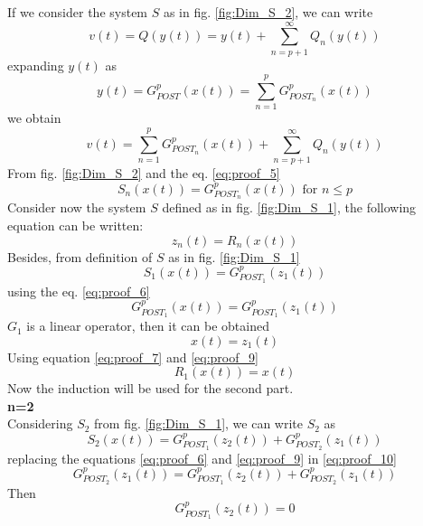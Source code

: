 If we consider the system $S$ as in fig. \ref{fig:Dim_S_2}, we can write
\begin{equation}
v(t) = Q(y(t)) = y(t) + \sum_{n=p+1}^\infty Q_n (y(t))
\end{equation}
expanding $y(t)$ as
\begin{equation}
y(t) = G_{POST}^p (x(t)) = \sum_{n=1}^p G_{POST_n}^p (x(t))
\end{equation}
we obtain
\begin{equation}
v(t) = \sum_{n=1}^p G_{POST_n}^p (x(t)) + \sum_{n=p+1}^\infty Q_n (y(t))
\label{eq:proof_5}
\end{equation}
From fig. \ref{fig:Dim_S_2} and the eq. \ref{eq:proof_5}
\begin{equation}
S_n(x(t)) = G_{POST_n}^p (x(t)) \text{ for } n \leq p
\label{eq:proof_6}
\end{equation}
Consider now the system $S$ defined as in fig. \ref{fig:Dim_S_1}, the following equation can be written:
\begin{equation}
z_n(t) = R_n(x(t))
\label{eq:proof_7}
\end{equation}
Besides, from definition of $S$ as in fig. \ref{fig:Dim_S_1}
\begin{equation}
S_1 (x(t)) = G_{POST_1}^p (z_1(t))
\label{eq:proof_8}
\end{equation}
using the eq. \ref{eq:proof_6}
\begin{equation}
G_{POST_1}^p(x(t)) = G_{POST_1}^p (z_1(t))
\end{equation}
$G_1$ is a linear operator, then it can be obtained
\begin{equation}
x(t) = z_1(t)
\label{eq:proof_9}
\end{equation}
Using equation \ref{eq:proof_7} and \ref{eq:proof_9}
\begin{equation}
R_1 (x(t)) = x(t)
\end{equation}
Now the induction will be used for the second part.\\
\textbf{n=2}\\
Considering $S_2$ from fig. \ref{fig:Dim_S_1}, we can write $S_2$ as
\begin{equation}
S_2(x(t)) = G_{POST_1}^p (z_2 (t)) + G_{POST_2}^p(z_1(t))
\label{eq:proof_10}
\end{equation}
replacing the equations \ref{eq:proof_6} and \ref{eq:proof_9} in \ref{eq:proof_10}
\[G_{POST_2}^p(z_1(t)) =G_{POST_1}^p (z_2(t)) + G_{POST_2}^p( z_1 (t))\]
Then
\begin{equation}
G_{POST_1}^p (z_2 (t)) = 0
\label{eq:proof_11}
\end{equation}
